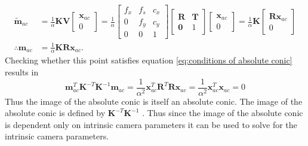 \documentclass[12pt,oneside,openany,a4paper, %
english, %
masters-t, goldenblock]{usthesis}
\begin{document}
\begin{align}
  \tilde{\bm{m}}_{ac} &=
  \frac{1}{\alpha} \bm{K} \bm{V}
  \begin{bmatrix}
  \bm{x}_{ac} \\
  0
  \end{bmatrix}=
   \frac{1}{\alpha} 
   \begin{bmatrix}
   f_x & f_s & c_x \\
   0 & f_y & c_y \\
   0 & 0 & 1 
   \end{bmatrix} 
  \begin{bmatrix}
  \bm{R} & \bm{T} \\
  \bm{0} & 1
  \end{bmatrix}
  \begin{bmatrix}
  \bm{x}_{ac} \\
  0
  \end{bmatrix} = \frac{1}{\alpha} \bm{K}
  \begin{bmatrix}
  \bm{R} \bm{x}_{ac} \\
  0
  \end{bmatrix} \\
  \therefore \bm{m}_{ac} &= \frac{1}{\alpha} \bm{K} \bm{R} \bm{x}_{ac}.
\end{align}
Checking whether this point satisfies equation \ref{eq:conditions of absolute conic} results in
\begin{equation}
  \bm{m}_{ac}^T \bm{K}^{-T} \bm{K}^{-1} \bm{m}_{ac} = \frac{1}{\alpha^2} \bm{x}_{ac}^T \bm{R}^T \bm{R} \bm{x}_{ac} = \frac{1}{\alpha^2} \bm{x}_{ac}^T \bm{x}_{ac} = 0
\end{equation}
Thus the image of the absolute conic is itself an absolute conic.  The image of the absolute conic is defined by $\bm{K}^{-T} \bm{K}^{-1}$ \cite{luong1997self}. Thus since the image of the absolute conic is dependent only on intrinsic camera parameters it can be used to solve for the intrinsic camera parameters.

\end{document}
